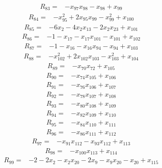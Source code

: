 \[\begin{aligned}R_{83}={}&-x_{97}x_{98}-x_{98}+x_{99}
\end{aligned}\]
\[\begin{aligned}R_{84}={}&-x_{95}^{2}+2x_{95}x_{99}-x_{99}^{2}+x_{100}
\end{aligned}\]
\[\begin{aligned}R_{85}={}&-6x_{2}-4x_{2}x_{13}-2x_{2}x_{23}+x_{101}
\end{aligned}\]
\[\begin{aligned}R_{86}={}&-1-x_{17}-x_{17}x_{101}-x_{101}+x_{102}
\end{aligned}\]
\[\begin{aligned}R_{87}={}&-1-x_{16}-x_{16}x_{94}-x_{94}+x_{103}
\end{aligned}\]
\[\begin{aligned}R_{88}={}&-x_{102}^{2}+2x_{102}x_{103}-x_{103}^{2}+x_{104}
\end{aligned}\]
\[\begin{aligned}R_{89}={}&-x_{70}x_{72}+x_{105}
\end{aligned}\]
\[\begin{aligned}R_{90}={}&-x_{74}x_{105}+x_{106}
\end{aligned}\]
\[\begin{aligned}R_{91}={}&-x_{76}x_{106}+x_{107}
\end{aligned}\]
\[\begin{aligned}R_{92}={}&-x_{78}x_{107}+x_{108}
\end{aligned}\]
\[\begin{aligned}R_{93}={}&-x_{80}x_{108}+x_{109}
\end{aligned}\]
\[\begin{aligned}R_{94}={}&-x_{82}x_{109}+x_{110}
\end{aligned}\]
\[\begin{aligned}R_{95}={}&-x_{84}x_{110}+x_{111}
\end{aligned}\]
\[\begin{aligned}R_{96}={}&-x_{86}x_{111}+x_{112}
\end{aligned}\]
\[\begin{aligned}R_{97}={}&-x_{91}x_{112}-x_{93}x_{112}+x_{113}
\end{aligned}\]
\[\begin{aligned}R_{98}={}&-x_{100}x_{113}+x_{114}
\end{aligned}\]
\[\begin{aligned}R_{99}={}&-2-2x_{2}-x_{2}x_{20}-2x_{9}-x_{9}x_{20}-x_{20}+x_{115}
\end{aligned}\]
